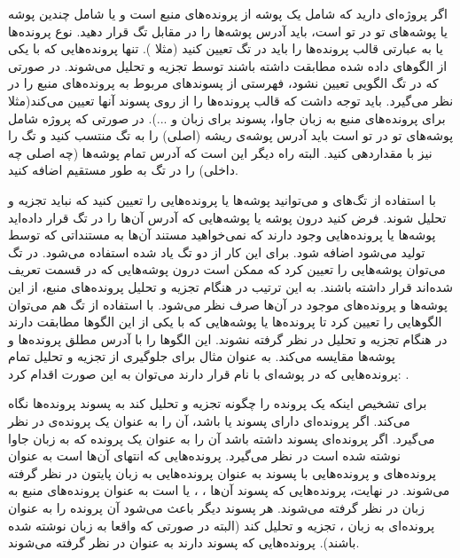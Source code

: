 اگر پروژه‌ای دارید که شامل یک پوشه از پرونده‌های منبع است و یا شامل چندین پوشه
یا پوشه‌های تو در تو است، باید آدرس پوشه‌ها را در مقابل تگ  قرار دهید.
نوع پرونده‌ها یا به عبارتی قالب پرونده‌ها را باید در تگ 
تعیین کنید (مثلا ). تنها پرونده‌هایی که با یکی از الگوهای داده شده
مطابقت داشته باشند توسط  تجزیه و تحلیل می‌شوند. در صورتی که در تگ
 الگویی تعیین نشود،  فهرستی از پسوندهای مربوط به
پرونده‌های منبع را در نظر می‌گیرد. باید توجه داشت که  قالب پرونده‌ها
را از روی پسوند آنها تعیین می‌کند(مثلا  برای پرونده‌های منبع به زبان
جاوا، پسوند  برای زبان  و ...). در صورتی که پروژه شامل پوشه‌های
تو در تو است باید آدرس پوشه‌ی ریشه (اصلی) را به تگ  منتسب کنید و تگ
 را نیز با  مقداردهی کنید. البته راه دیگر این است که آدرس
تمام پوشه‌ها (چه اصلی چه داخلی) را در تگ  به طور مستقیم اضافه کنید.

با استفاده از تگ‌های  و  می‌توانید پوشه‌ها یا
پرونده‌هایی را تعیین کنید که نباید تجزیه و تحلیل شوند. فرض کنید درون پوشه یا
پوشه‌هایی که آدرس آن‌ها را در تگ  قرار داده‌اید پوشه‌ها یا پرونده‌هایی
وجود دارند که نمی‌خواهید مستند آن‌ها به مستنداتی که توسط  تولید
می‌شود اضافه شود. برای این کار از دو تگ یاد شده استفاده می‌شود. در تگ
 می‌توان پوشه‌هایی را تعیین کرد که ممکن است درون پوشه‌هایی که در
قسمت  تعریف شده‌اند قرار داشته باشند. به این ترتیب در هنگام تجزیه و
تحلیل پرونده‌های منبع، از این پوشه‌ها و پرونده‌های موجود در آن‌ها صرف نظر
می‌شود. با استفاده از تگ  هم می‌توان الگوهایی را تعیین کرد
تا پرونده‌ها یا پوشه‌هایی که با یکی از این الگوها مطابقت دارند در هنگام تجزیه و
تحلیل در نظر گرفته نشوند.  این الگوها را با آدرس مطلق پرونده‌ها و
پوشه‌ها مقایسه می‌کند. به عنوان مثال برای جلوگیری از تجزیه و تحلیل تمام
پرونده‌هایی که در پوشه‌ای با نام  قرار دارند می‌توان به این صورت اقدام
کرد: .

برای تشخیص اینکه یک پرونده را چگونه تجزیه و تحلیل کند به پسوند پرونده‌ها نگاه
می‌کند. اگر پرونده‌ای دارای پسوند  یا  باشد، آن را به عنوان یک
پرونده‌ی  در نظر می‌گیرد. اگر پرونده‌ای پسوند  داشته باشد آن
را به عنوان یک پرونده که به زبان جاوا نوشته شده است در نظر می‌گیرد. پرونده‌هایی
که انتهای ‌آن‌ها  است به عنوان پرونده‌های  و پرونده‌هایی با
پسوند  به عنوان پرونده‌هایی به زبان پایتون  در نظر گرفته
می‌شوند. در نهایت، پرونده‌هایی که پسوند آن‌ها ، ، 
یا  است به عنوان پرونده‌های منبع به زبان  در نظر گرفته
می‌شوند. هر پسوند دیگر باعث می‌شود  آن پرونده را به عنوان پرونده‌ای
به زبان ، تجزیه و تحلیل کند (البته در صورتی که واقعا به زبان
 نوشته شده باشند). پرونده‌هایی که پسوند  دارند به عنوان
 در نظر گرفته می‌شوند.

